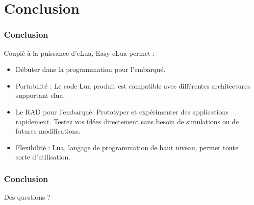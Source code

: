 \documentclass{beamer}
\begin{document}
\section{Conclusion}
\begin{frame}
\frametitle{Conclusion}
Couplé à la puissance d'eLua, Easy-eLua permet :
\begin{itemize}
\item Débuter dans la programmation pour l'embarqué.
\item Portabilité : Le code Lua produit est compatible avec différentes architectures supportant elua.
\item Le RAD pour l'embarqué: Prototyper et expérimenter des applications rapidement. Testez vos idées directement sans besoin de simulations ou de futures modifications.
\item Flexibilité : Lua, langage de programmation de haut niveau, permet toute sorte d'utilisation.
\end{itemize}
\end{frame}

\begin{frame}
\frametitle{Conclusion}
\begin{center}
\huge{Des questions ?}
\end{center}
\end{frame}
\end{document}
